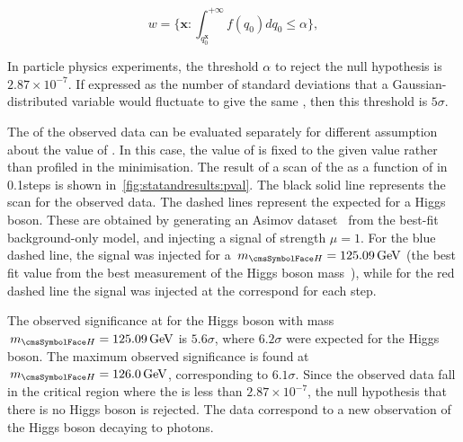 \begin{equation}
w = \{ \mathbf{x} : \int_{q^{\mathbf{x}}_{0}}^{+\infty} f(q_{0}) dq_0  \leq \alpha \},
\end{equation}

In particle physics experiments, the threshold $\alpha$ to reject the null hypothesis is $2.87 \times 10^{-7}$. If expressed as the number of standard deviations that a Gaussian-distributed variable would fluctuate to give the same \pvalue, then this threshold is $5\sigma$.

The \pvalue of the observed data can be evaluated separately for different assumption about the value of \mH. In this case, the value of \mH is fixed to the given value rather than profiled in the \DNLL minimisation. The result of a scan of the \pvalue\s as a function of \mH in 0.1\GeV steps is shown in~\ref{fig:statandresults:pval}. The black solid line represents the \pvalue scan for the observed data. The dashed lines represent the expected \pvalue\s for a \SM Higgs boson. These are obtained by generating an Asimov dataset~\cite{} from the best-fit background-only model, and injecting a signal of strength $\mu=1$. For the blue dashed line, the signal was injected for a $\mH=125.09\GeV$ (the best fit value from the best measurement of the Higgs boson mass~\cite{}), while for the red dashed line the signal was injected at the correspond \mH for each step. 

The observed significance at for the Higgs boson with mass $\mH=125.09\GeV$ is $5.6\sigma$, where $6.2\sigma$ were expected for the \SM Higgs boson. The maximum observed significance is found at $\mH=126.0\GeV$, corresponding to $6.1\sigma$.
Since the observed data fall in the critical region where the \pvalue is less than $2.87 \times 10^{-7}$, the null hypothesis that there is no Higgs boson is rejected. The data correspond to a new observation of the Higgs boson decaying to photons.

